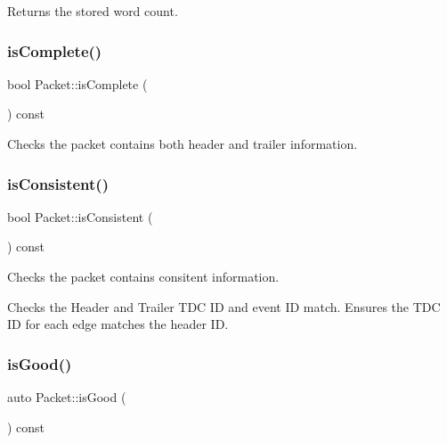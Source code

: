 Returns the stored word count. 

\mbox{\label{class_packet_a6b5ce354c03663c98cccd31ad9a6f5ff}} 
\subsubsection{\texorpdfstring{is\+Complete()}{isComplete()}}
{\footnotesize\ttfamily bool Packet\+::is\+Complete (\begin{DoxyParamCaption}{ }\end{DoxyParamCaption}) const}



Checks the packet contains both header and trailer information. 

\mbox{\label{class_packet_a8d9e544f6f56389fa13bb01b2d37ca58}} 
\subsubsection{\texorpdfstring{is\+Consistent()}{isConsistent()}}
{\footnotesize\ttfamily bool Packet\+::is\+Consistent (\begin{DoxyParamCaption}{ }\end{DoxyParamCaption}) const}



Checks the packet contains consitent information. 

Checks the Header and Trailer T\+DC ID and event ID match. Ensures the T\+DC ID for each edge matches the header ID. \mbox{\label{class_packet_a19762fa917b80da872ecff9cbb389509}} 
\subsubsection{\texorpdfstring{is\+Good()}{isGood()}}
{\footnotesize\ttfamily auto Packet\+::is\+Good (\begin{DoxyParamCaption}{ }\end{DoxyParamCaption}) const\hspace{0.3cm}{\ttfamily [inline]}}



